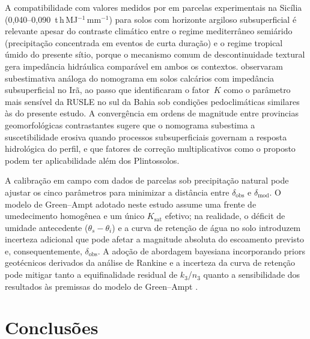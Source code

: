\documentclass[pdflatex,sn-basic]{sn-jnl}
\begin{document}
A compatibilidade com valores medidos por \citet{bagarello_et_al_2012} em parcelas experimentais na Sicília (0,040--0,090~t\,h\,MJ$^{-1}$\,mm$^{-1}$) para solos com horizonte argiloso subsuperficial é relevante apesar do contraste climático entre o regime mediterrâneo semiárido (precipitação concentrada em eventos de curta duração) e o regime tropical úmido do presente sítio, porque o mecanismo comum de descontinuidade textural gera impedância hidráulica comparável em ambos os contextos. \citet{ostovari_et_al_2016} observaram subestimativa análoga do nomograma em solos calcários com impedância subsuperficial no Irã, ao passo que \citet{francois_et_al_2024} identificaram o fator~$K$ como o parâmetro mais sensível da RUSLE no sul da Bahia sob condições pedoclimáticas similares às do presente estudo. A convergência em ordens de magnitude entre provincias geomorfológicas contrastantes sugere que o nomograma subestima a suscetibilidade erosiva quando processos subsuperficiais governam a resposta hidrológica do perfil, e que fatores de correção multiplicativos como o proposto podem ter aplicabilidade além dos Plintossolos.

A calibração em campo com dados de parcelas sob precipitação natural pode ajustar os cinco parâmetros para minimizar a distância entre $\delta_{\mathrm{obs}}$ e $\delta_{\mathrm{mod}}$. O modelo de Green--Ampt adotado neste estudo assume uma frente de umedecimento homogênea e um único $K_{\mathrm{sat}}$ efetivo; na realidade, o déficit de umidade antecedente ($\theta_s - \theta_i$) e a curva de retenção de água no solo introduzem incerteza adicional que pode afetar a magnitude absoluta do escoamento previsto e, consequentemente, $\delta_{\mathrm{obs}}$. A adoção de abordagem bayesiana incorporando priors geotécnicos derivados da análise de Rankine e a incerteza da curva de retenção pode mitigar tanto a equifinalidade residual de $k_3$/$n_3$ quanto a sensibilidade dos resultados às premissas do modelo de Green--Ampt \citep{beven_freer_2001}.

\section{Conclusões}
\label{sec:conclusions}
\end{document}
